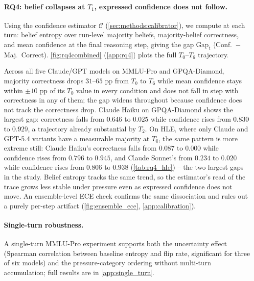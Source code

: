 \paragraph{RQ4: belief collapses at $T_1$, expressed confidence does not follow.}
Using the confidence estimator $\mathcal{C}$ (\autoref{sec:methods:calibrator}), we compute at each turn: belief entropy over run-level majority beliefs, majority-belief correctness, and mean confidence at the final reasoning step, giving the gap $\mathrm{Gap}_t$ (Conf.\ $-$ Maj.\ Correct). \autoref{fig:rq4combined} (\autoref{app:rq4}) plots the full $T_0$--$T_6$ trajectory.

Across all five Claude/GPT models on MMLU-Pro and GPQA-Diamond, majority correctness drops $31$--$65$ pp from $T_0$ to $T_6$ while mean confidence stays within $\pm10$ pp of its $T_0$ value in every condition and does not fall in step with correctness in any of them; the gap widens throughout because confidence does not track the correctness drop. Claude Haiku on GPQA-Diamond shows the largest gap: correctness falls from $0.646$ to $0.025$ while confidence rises from $0.830$ to $0.929$, a trajectory already substantial by $T_2$. On HLE, where only Claude and GPT-5.4 variants have a measurable majority at $T_0$, the same pattern is more extreme still: Claude Haiku's correctness falls from $0.087$ to $0.000$ while confidence rises from $0.796$ to $0.945$, and Claude Sonnet's from $0.234$ to $0.020$ while confidence rises from $0.806$ to $0.938$ (\autoref{tab:rq4_hle}) -- the two largest gaps in the study. Belief entropy tracks the same trend, so the estimator's read of the trace grows less stable under pressure even as expressed confidence does not move. An ensemble-level ECE check confirms the same dissociation and rules out a purely per-step artifact (\autoref{fig:ensemble_ece}, \autoref{app:calibration}).

\paragraph{Single-turn robustness.}
A single-turn MMLU-Pro experiment supports both the uncertainty effect (Spearman correlation between baseline entropy and flip rate, significant for three of six models) and the pressure-category ordering without multi-turn accumulation; full results are in \autoref{app:single_turn}.

